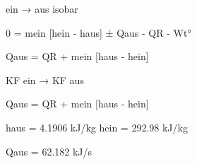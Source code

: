 ein → aus isobar  

0 = mein [hein - haus] ± Qaus - QR - Wt°  

Qaus = QR + mein [haus - hein]  

KF ein → KF aus  

Qaus = QR + mein [haus - hein]  

haus = 4.1906 kJ/kg  
hein = 292.98 kJ/kg  

Qaus = 62.182 kJ/s